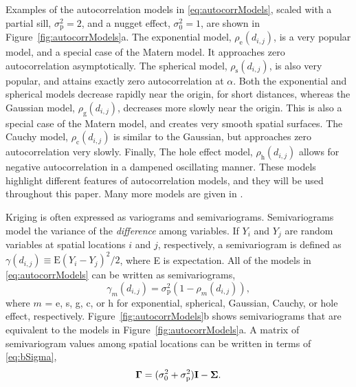 \documentclass[11pt, titlepage]{article}\usepackage[]{graphicx}\usepackage[]{color}
\begin{document}
\begin{spacing}{1.9}
\begin{flushleft}
Examples of the autocorrelation models in \ref{eq:autocorrModels}, scaled with a partial sill, $\sigma^2_{\textrm{p}} = 2$, and a nugget effect, $\sigma^2_0 = 1$, are shown in Figure~\ref{fig:autocorrModels}a.  The exponential model, $\rho_{\textrm{e}}(d_{i,j})$, is a very popular model, and a special case of the Matern model.  It approaches zero autocorrelation asymptotically. The spherical model, $\rho_{\textrm{s}}(d_{i,j})$, is also very popular, and attains exactly zero autocorrelation at $\alpha$.  Both the exponential and spherical models decrease rapidly near the origin, for short distances, whereas the Gaussian model, $\rho_{\textrm{g}}(d_{i,j})$, decreases more slowly near the origin. This is also a special case of the Matern model, and creates very smooth spatial surfaces. The Cauchy model, $\rho_{\textrm{c}}(d_{i,j})$ is similar to the Gaussian, but approaches zero autocorrelation very slowly. Finally, The hole effect model, $\rho_{\textrm{h}}(d_{i,j})$ allows for negative autocorrelation in a dampened oscillating manner. These models highlight different features of autocorrelation models, and they will be used throughout this paper. Many more models are given in \citet[][p. 80--93]{Chil:Delf:geos:1999}.  

Kriging is often expressed as variograms and semivariograms.  Semivariograms model the variance of the \emph{difference} among variables. If $Y_i$ and $Y_j$ are random variables at spatial locations $i$ and $j$, respectively, a semivariogram is defined as $\gamma(d_{i,j}) \equiv \textrm{E}(Y_i - Y_j)^2/2$, where E is expectation.  All of the models in \ref{eq:autocorrModels} can be written as semivariograms,
\begin{equation} \label{eq:semivarrho}
				\gamma_m(d_{i,j}) = \sigma^2_\textrm{p}(1 - \rho_m(d_{i,j})),
\end{equation}
where $m$ = e, s, g, c, or h for exponential, spherical, Gaussian, Cauchy, or hole effect, respectively. Figure~\ref{fig:autocorrModels}b shows semivariograms that are equivalent to the models in Figure~\ref{fig:autocorrModels}a.  A matrix of semivariogram values among spatial locations can be written in terms of \ref{eq:bSigma},
\[
\mbox{\boldmath $\Gamma$} = (\sigma_0^2 + \sigma^2_{\textrm{p}})\mathbf{I} - \mbox{\boldmath $\Sigma$}.
\]


\end{flushleft}
\end{spacing}
\end{document}

